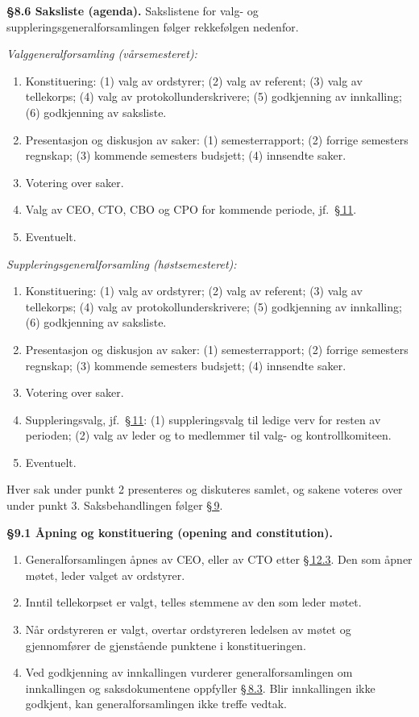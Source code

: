 \documentclass{../../../Common/Latex/Templates/rapport}
\begin{document}
\textbf{\S 8.6 Saksliste (agenda).}\label{nbylaw:8.6} Sakslistene for valg- og suppleringsgeneralforsamlingen følger rekkefølgen nedenfor.

\emph{Valggeneralforsamling (v\r{a}rsemesteret):}
\begin{enumerate}
  \item Konstituering: (1) valg av ordstyrer; (2) valg av referent; (3) valg av tellekorps; (4) valg av protokollunderskrivere; (5) godkjenning av innkalling; (6) godkjenning av saksliste.
  \item Presentasjon og diskusjon av saker: (1) semesterrapport; (2) forrige semesters regnskap; (3) kommende semesters budsjett; (4) innsendte saker.
  \item Votering over saker.
  \item Valg av CEO, CTO, CBO og CPO for kommende periode, jf.\ \hyperref[nbylaw:11]{\S\,11}.
  \item Eventuelt.
\end{enumerate}

\emph{Suppleringsgeneralforsamling (høstsemesteret):}
\begin{enumerate}
  \item Konstituering: (1) valg av ordstyrer; (2) valg av referent; (3) valg av tellekorps; (4) valg av protokollunderskrivere; (5) godkjenning av innkalling; (6) godkjenning av saksliste.
  \item Presentasjon og diskusjon av saker: (1) semesterrapport; (2) forrige semesters regnskap; (3) kommende semesters budsjett; (4) innsendte saker.
  \item Votering over saker.
  \item Suppleringsvalg, jf.\ \hyperref[nbylaw:11]{\S\,11}: (1) suppleringsvalg til ledige verv for resten av perioden; (2) valg av leder og to medlemmer til valg- og kontrollkomiteen.
  \item Eventuelt.
\end{enumerate}

Hver sak under punkt 2 presenteres og diskuteres samlet, og sakene voteres over under punkt 3. Saksbehandlingen følger \hyperref[nbylaw:9]{\S\,9}.

\label{nbylaw:9}
\textbf{\S 9.1 \r{A}pning og konstituering (opening and constitution).}\label{nbylaw:9.1}
\begin{enumerate}
  \item Generalforsamlingen \r{a}pnes av CEO, eller av CTO etter \hyperref[nbylaw:12.3]{\S\,12.3}. Den som \r{a}pner møtet, leder valget av ordstyrer.
  \item Inntil tellekorpset er valgt, telles stemmene av den som leder møtet.
  \item N\r{a}r ordstyreren er valgt, overtar ordstyreren ledelsen av møtet og gjennomfører de gjenst\r{a}ende punktene i konstitueringen.
  \item Ved godkjenning av innkallingen vurderer generalforsamlingen om innkallingen og saksdokumentene oppfyller \hyperref[nbylaw:8.3]{\S\,8.3}. Blir innkallingen ikke godkjent, kan generalforsamlingen ikke treffe vedtak.
\end{enumerate}
\end{document}
